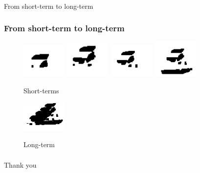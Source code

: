 \documentclass{beamer}
\begin{document}
\begin{frame}{From short-term to long-term}
	\frametitle{From short-term to long-term}
	\begin{figure}[b]
		\centering
		\includegraphics[width=0.2\textwidth]{images/frame1.png}
		\includegraphics[width=0.2\textwidth]{images/frame2.png}
		\includegraphics[width=0.2\textwidth]{images/frame3.png}
		\includegraphics[width=0.2\textwidth]{images/frame4.png}

		\begin{center}
			Short-terms  
		\end{center}

		\vspace{1cm} 

		\includegraphics[width=0.2\textwidth]{images/frame_sum.png}

		\begin{center}
			Long-term  
		\end{center}
	\end{figure}
\end{frame}



\begin{frame}{}
	\frametitle{}
	\begin{center}
		Thank you
	\end{center}
\end{frame}
\end{document}
